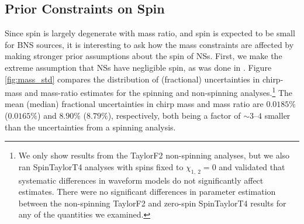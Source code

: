 \subsection{Prior Constraints on Spin}
\label{subsec:prior_constraints}

Since spin is largely degenerate with mass ratio, and spin is expected to be small for BNS sources, it is interesting to ask how the mass constraints are affected by making stronger prior assumptions about the spin of NSs.  First, we make the extreme assumption that NSs have negligible spin, as was done in \citet{Singer_2014}.  Figure \ref{fig:mass_std} compares the distribution of (fractional) uncertainties in chirp-mass and mass-ratio estimates for the spinning and non-spinning analyses.\footnote{We only show results from the TaylorF2 non-spinning analyses, but we also ran SpinTaylorT4 analyses with spins fixed to $\chi_{1,~2}=0$ and validated that systematic differences in waveform models do not significantly affect estimates. There were no significant differences in parameter estimation between the non-spinning TaylorF2 and zero-spin SpinTaylorT4 results for any of the quantities we examined.} The mean (median) fractional uncertainties in chirp mass and mass ratio are $0.0185\%$ ($0.0165\%$) and $8.90\%$ ($8.79\%$), respectively, both being a factor of $\sim3$--$4$ smaller than the uncertainties from a spinning analysis.
  
  
  
  
  
  
  